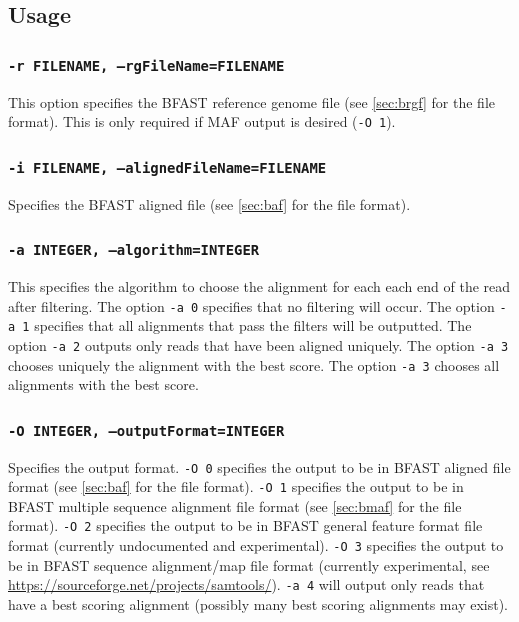 \documentclass[a4paper,12pt]{book}
\newcommand{\TT}[1]{{\tt #1}} %
\newcommand{\BRGF}{BFAST reference genome file} %
\newcommand{\BAF}{BFAST aligned file} %
\newcommand{\BMAF}{BFAST multiple sequence alignment file} %
\newcommand{\BGFFF}{BFAST general feature format file} %
\newcommand{\BSAMF}{BFAST sequence alignment/map file} %
\begin{document}
\subsection{Usage}

\subsubsection{\TT{-r FILENAME, --rgFileName=FILENAME}}
This option specifies the \BRGF{} (see \autoref{sec:brgf} for the file format).
This is only required if MAF output is desired (\TT{-O 1}).

\subsubsection{\TT{-i FILENAME, --alignedFileName=FILENAME}}
Specifies the \BAF{} (see \autoref{sec:baf} for the file format).

\subsubsection{\TT{-a INTEGER, --algorithm=INTEGER}}
This specifies the algorithm to choose the alignment for each each end of the read after filtering.
The option \TT{-a 0} specifies that no filtering will occur.
The option \TT{-a 1} specifies that all alignments that pass the filters will be outputted.
The option \TT{-a 2} outputs only reads that have been aligned uniquely.
The option \TT{-a 3} chooses uniquely the alignment with the best score.
The option \TT{-a 3} chooses all alignments with the best score.

\subsubsection{\TT{-O INTEGER, --outputFormat=INTEGER}}
Specifies the output format.
\TT{-O 0} specifies the output to be in \BAF{} format (see \autoref{sec:baf} for the file format).
\TT{-O 1} specifies the output to be in \BMAF{} format (see \autoref{sec:bmaf} for the file format).
\TT{-O 2} specifies the output to be in \BGFFF{} format (currently undocumented and experimental).
\TT{-O 3} specifies the output to be in \BSAMF{} format (currently experimental, see \url{https://sourceforge.net/projects/samtools/}).
\TT{-a 4} will output only reads that have a best scoring alignment (possibly many best scoring alignments may exist).
\end{document}
